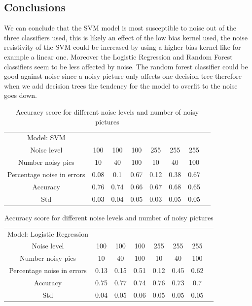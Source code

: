 \documentclass{article}
\begin{document}
\subsection{Conclusions}
We can conclude that the SVM model is most susceptible to noise out of the three classifiers used, this is likely an effect of the low bias kernel used, the noise resistivity of the SVM could be increased by using a higher bias kernel like for example a linear one. Moreover the Logistic Regression and Random Forest classifiers seem to be less affected by noise. The random forest classifier could be good against noise since a noisy picture only affects one decision tree therefore when we add decision trees the tendency for the model to overfit to the noise goes down. 
\begin{table}[H]
    \centering
    \begin{tabular}{c|c|c|c|c|c|c|c}
   Model: SVM \\
    Noise level  & 100 & 100 & 100 & 255 & 255 & 255 \\
       Number noisy pics & 10 & 40 & 100 & 10& 40 & 100 \\
        Percentage noise in errors & 0.08& 0.1 & 0.67 & 0.12& 0.38& 0.67  \\
       Accuracy & 0.76 & 0.74 & 0.66 & 0.67 & 0.68 & 0.65 \\
       Std & 0.03& 0.04 & 0.05 & 0.03 & 0.05 & 0.05\\
    \end{tabular}
    \caption{Accuracy score for different noise levels and number of noisy pictures}
    \label{SVM table}
\end{table}
\begin{table}[H]
\centering
    \begin{tabular}{c|c|c|c|c|c|c|c}
   Model: Logistic Regression \\
    Noise level  & 100 & 100 & 100 & 255 & 255 & 255 \\
       Number noisy pics & 10 & 40 & 100 & 10& 40 & 100 \\
        Percentage noise in errors & 0.13& 0.15 & 0.51 & 0.12 & 0.45& 0.62  \\
       Accuracy & 0.75 & 0.77 & 0.74 & 0.76 & 0.73 & 0.7 \\
       Std & 0.04& 0.05 & 0.06 & 0.05 & 0.05 & 0.05\\
    \end{tabular}
    \caption{Accuracy score for different noise levels and number of noisy pictures}
    \label{LR table}
\end{table}
\end{document}
